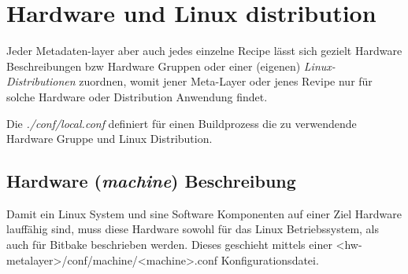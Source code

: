 

\chapter{Hardware und Linux distribution}%
\label{sec:hardware_und_linux_distribution}

Jeder Metadaten-layer aber auch jedes einzelne Recipe lässt sich gezielt
Hardware Beschreibungen bzw Hardware Gruppen oder einer (eigenen)
\textit{Linux-\gls{Distributionen}} zuordnen, womit jener Meta-Layer oder jenes
Revipe nur für solche Hardware oder Distribution Anwendung findet.

Die \textit{./conf/local.conf} definiert für einen Buildprozess die zu
verwendende Hardware Gruppe und Linux Distribution.

\section{Hardware (\textit{machine}) Beschreibung}%
\label{sec:hardware_machine_beschreibung}

Damit ein Linux System und sine Software Komponenten auf einer Ziel Hardware
lauffähig sind, muss diese Hardware sowohl für das Linux Betriebssystem, als
auch für Bitbake beschrieben werden. Dieses geschieht mittels
einer <hw-metalayer>/conf/machine/<machine>.conf Konfigurationsdatei.

\\

